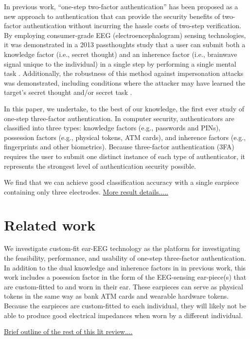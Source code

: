 \documentclass[letterpaper,twocolumn,10pt]{article}
\begin{document}
In previous work, “one-step two-factor authentication” has been proposed as a
new approach to authentication that can provide the security benefits of two-
factor authentication without incurring the hassle costs of two-step verification.
By employing consumer-grade EEG (electroencephalogram) sensing
technologies, it was demonstrated in a 2013 passthoughts study that a user can
submit both a knowledge factor (i.e., secret thought) and an inherence factor
(i.e., brainwave signal unique to the individual) in a single step by performing a
single mental task \cite{Chuang2014}. Additionally, the robustness of this method against
impersonation attacks was demonstrated, including conditions where the attacker
may have learned the target’s secret thought and/or secret task \cite{Johnson2014}.

In this paper, we undertake, to the best of our knowledge, the first
ever study of one-step three-factor authentication. In computer security,
authenticators are classified into three types: knowledge factors (e.g., passwords
and PINs), possession factors (e.g., physical tokens, ATM cards), and inherence
factors (e.g., fingerprints and other biometrics). Because three-factor
authentication (3FA) requires the user to submit one distinct instance of each
type of authenticator, it represents the strongest level of authentication security
possible.

We find that we can achieve good classification accuracy with a single earpiece containing only three electrodes. \underline{More result details.....}

\section{Related work}

We investigate custom-fit ear-EEG technology as the platform for
investigating the feasibility, performance, and usability of one-step three-factor
authentication. In addition to the dual knowledge and inherence factors in
in previous work, this work includes a posession factor
in the form of the EEG-sensing ear-piece(s) that are custom-fitted to and worn in
their ear. These earpieces can serve as physical tokens in the same way as bank
ATM cards and wearable hardware tokens. Because the earpieces
are custom-fitted to each individual, they will likely not be able to produce good
electrical impedances when worn by a different individual.

\underline{Brief outline of the rest of this lit review....}
\end{document}
